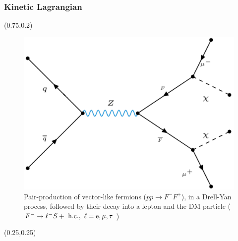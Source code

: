 \documentclass{beamer}
\begin{document}
\begin{frame}
\frametitle{Kinetic Lagrangian}

\begin{textblock*}{0.5\linewidth}(0.75\linewidth,0.2\linewidth) %
	
	\begin{figure}[!tbp]
		\centering
		\includegraphics[width=1\textwidth]{pictures/DYVLFNoJet}
		\caption{{\scriptsize Pair-production of vector-like fermions ($p p \to F^- F^+ $),
				in a Drell-Yan process, followed by their decay into a lepton and the DM particle ($F^- \to \ell^- S +\rm{\ h.c.},\ \ell=e,\mu,\tau$ )}}
		\label{TowFerminon}
	\end{figure}
\end{textblock*}

\begin{textblock*}{0.46 \linewidth}(0.25\linewidth,0.25\linewidth) %
	{\small {}}
\end{textblock*}

\end{frame}
\end{document}
